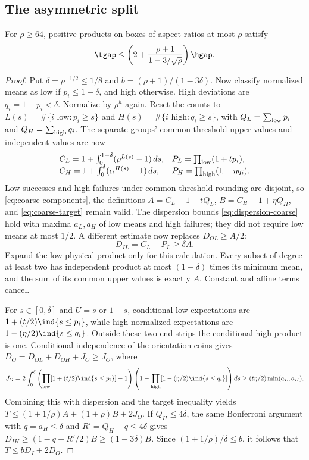 \subsection{The asymmetric split}
\begin{proposition}\label{prop:asymmetric-box}
For $\rho\ge64$, positive products on boxes of aspect ratios at most
$\rho$ satisfy
\[
 \tgap\le\left(2+\frac{\rho+1}{1-3/\sqrt\rho}\right)\hgap.
\]
\end{proposition}
\begin{proof}
Put $\delta=\rho^{-1/2}\le1/8$ and $b=(\rho+1)/(1-3\delta)$.
Now classify normalized means as low if $p_i\le1-\delta$, and high
otherwise. High deviations are $q_i=1-p_i<\delta$. Normalize by
$\rho^h$ again. Reset the counts to
$L(s)=\#\{i\text{ low}:p_i\ge s\}$ and
$H(s)=\#\{i\text{ high}:q_i\ge s\}$, with
$Q_L=\sum_{\rm low}p_i$ and $Q_H=\sum_{\rm high}q_i$.
The separate groups' common-threshold upper values and independent
values are now
\[
 \begin{array}{ll}
 C_L=1+\int_0^{1-\delta}(\rho^{L(s)}-1)\,ds,
 &P_L=\prod_{\rm low}(1+tp_i),\\
 C_H=1+\int_0^\delta(\alpha^{H(s)}-1)\,ds,
 &P_H=\prod_{\rm high}(1-\eta q_i).
 \end{array}
\]
Low successes and high failures under common-threshold rounding are
disjoint, so \eqref{eq:coarse-components}, the definitions
$A=C_L-1-tQ_L$, $B=C_H-1+\eta Q_H$, and
\eqref{eq:coarse-target} remain valid. The dispersion bounds
\eqref{eq:dispersion-coarse} hold with maxima $a_L,a_H$ of low means
and high failures; they did not require low means at most $1/2$.
A different estimate now replaces $D_{OL}\ge A/2$:
\[
 D_{IL}=C_L-P_L\ge\delta A.
\]
Expand the low physical product only for this calculation. Every
subset of degree at least two has independent product at most
$(1-\delta)$ times its minimum mean, and the sum of its common upper
values is exactly $A$. Constant and affine terms cancel.

For $s\in[0,\delta]$ and $U=s$ or $1-s$, conditional low expectations
are $1+(t/2)\ind\{s\le p_i\}$, while high normalized expectations
are $1-(\eta/2)\ind\{s\le q_i\}$. Outside these two end strips
the conditional high product is one. Conditional independence of the
orientation coins gives $D_O=D_{OL}+D_{OH}+J_O\ge J_O$, where
\[
 J_O=2\int_0^\delta
 \left(\prod_{\rm low}[1+(t/2)\ind\{s\le p_i\}]-1\right)
 \left(1-\prod_{\rm high}[1-(\eta/2)\ind\{s\le q_i\}]\right)ds
 \ge(t\eta/2)\min(a_L,a_H).
\]
Combining this with dispersion and the target inequality yields
$T\le(1+1/\rho)A+(1+\rho)B+2J_O$.
If $Q_H\le4\delta$, the same Bonferroni argument with $q=a_H\le\delta$
and $R'=Q_H-q\le4\delta$ gives
$D_{IH}\ge(1-q-R'/2)B\ge(1-3\delta)B$.
Since $(1+1/\rho)/\delta\le b$, it follows that
$T\le bD_I+2D_O$.


\end{proof}
